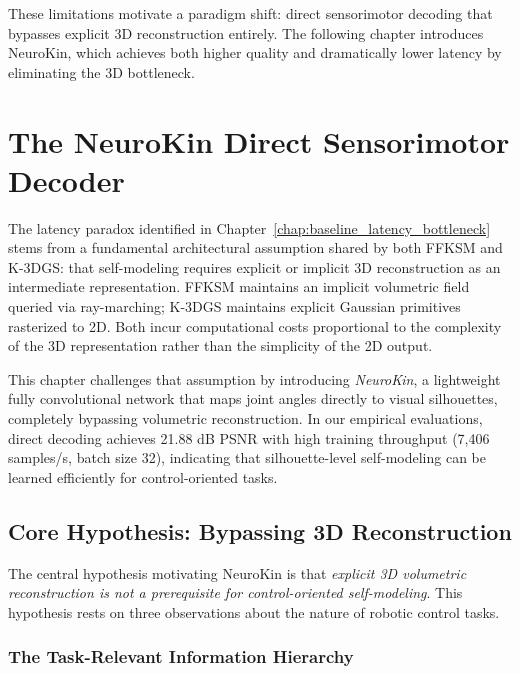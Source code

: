 \documentclass[12pt,a4paper,oneside]{report}
\begin{document}
These limitations motivate a paradigm shift: direct sensorimotor decoding that bypasses explicit 3D reconstruction entirely. The following chapter introduces NeuroKin, which achieves both higher quality and dramatically lower latency by eliminating the 3D bottleneck.









\chapter{The NeuroKin Direct Sensorimotor Decoder}
\label{chap:neurokin_decoder}

The latency paradox identified in Chapter~\ref{chap:baseline_latency_bottleneck} stems from a fundamental architectural assumption shared by both FFKSM and K-3DGS: that self-modeling requires explicit or implicit 3D reconstruction as an intermediate representation. FFKSM maintains an implicit volumetric field queried via ray-marching; K-3DGS maintains explicit Gaussian primitives rasterized to 2D. Both incur computational costs proportional to the complexity of the 3D representation rather than the simplicity of the 2D output.

This chapter challenges that assumption by introducing \textit{NeuroKin}, a lightweight fully convolutional network that maps joint angles directly to visual silhouettes, completely bypassing volumetric reconstruction. In our empirical evaluations, direct decoding achieves 21.88 dB PSNR with high training throughput (7,406 samples/s, batch size 32), indicating that silhouette-level self-modeling can be learned efficiently for control-oriented tasks.

\section{Core Hypothesis: Bypassing 3D Reconstruction}

The central hypothesis motivating NeuroKin is that \textit{explicit 3D volumetric reconstruction is not a prerequisite for control-oriented self-modeling}. This hypothesis rests on three observations about the nature of robotic control tasks.

\subsection{The Task-Relevant Information Hierarchy}
\label{subsec:the_task_relevant_information_hierarchy}
\end{document}
